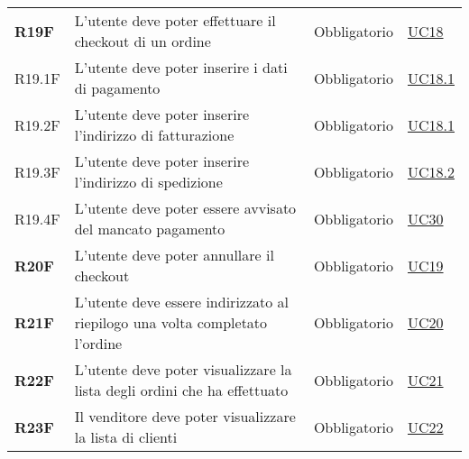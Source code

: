 \begin{center}
\begin{longtable}[!h]{p{50px} p{245px} p{75px} p{50px}}
        \textbf{R19F}                         & L'utente deve poter effettuare il checkout di un ordine                                                                                                & Obbligatorio             & \hyperref[sec:UC18]{UC18}                    \\
        R19.1F                                & L'utente deve poter inserire i dati di pagamento                                                                                                       & Obbligatorio             & \hyperref[sec:UC18.1]{UC18.1}                \\
        R19.2F                                & L'utente deve poter inserire l'indirizzo di fatturazione                                                                                               & Obbligatorio             & \hyperref[sec:UC18.1]{UC18.1}                \\
        R19.3F                                & L'utente deve poter inserire l'indirizzo di spedizione                                                                                                 & Obbligatorio             & \hyperref[sec:UC18.2]{UC18.2}                \\
        R19.4F                                & L'utente deve poter essere avvisato del mancato pagamento                                                                                              & Obbligatorio             & \hyperref[sec:UC30]{UC30}                    \\
        \textbf{R20F}                         & L'utente deve poter annullare il checkout                                                                                                              & Obbligatorio             & \hyperref[sec:UC19]{UC19}                    \\
        \textbf{R21F}                         & L'utente deve essere indirizzato al riepilogo una volta completato l'ordine                                                                            & Obbligatorio             & \hyperref[sec:UC20]{UC20}                    \\
        \textbf{R22F}                         & L'utente deve poter visualizzare la lista degli ordini che ha effettuato                                                                               & Obbligatorio             & \hyperref[sec:UC21]{UC21}                    \\
        \textbf{R23F}                         & Il venditore deve poter visualizzare la lista di clienti                                                                                               & Obbligatorio             & \hyperref[sec:UC22]{UC22}                    \\

\end{longtable}
\end{center}

